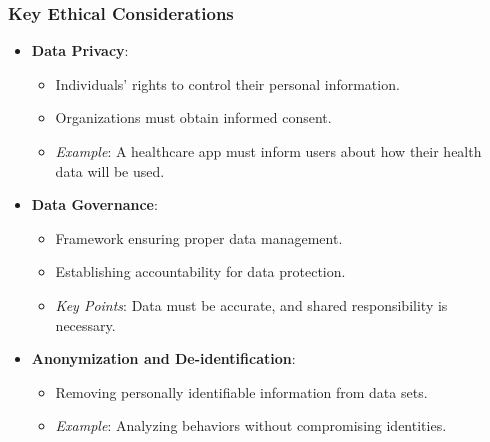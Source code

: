 \documentclass[aspectratio=169]{beamer}
\begin{document}
\begin{frame}[fragile]
    \frametitle{Key Ethical Considerations}
    \begin{itemize}
        \item \textbf{Data Privacy}:
        \begin{itemize}
            \item Individuals' rights to control their personal information.
            \item Organizations must obtain informed consent.
            \item \textit{Example}: A healthcare app must inform users about how their health data will be used.
        \end{itemize}

        \item \textbf{Data Governance}:
        \begin{itemize}
            \item Framework ensuring proper data management.
            \item Establishing accountability for data protection.
            \item \textit{Key Points}: Data must be accurate, and shared responsibility is necessary.
        \end{itemize}

        \item \textbf{Anonymization and De-identification}:
        \begin{itemize}
            \item Removing personally identifiable information from data sets.
            \item \textit{Example}: Analyzing behaviors without compromising identities.
        \end{itemize}
    \end{itemize}
\end{frame}
\end{document}
